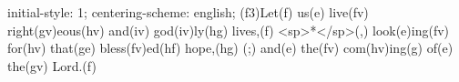 initial-style: 1;
centering-scheme: english;
(f3)Let(f) us(e) live(fv) right(gv)eous(hv) and(iv) god(iv)ly(hg) lives,(f) <sp>*</sp>(,) look(e)ing(fv) for(hv) that(ge) bless(fv)ed(hf) hope,(hg) (;) and(e) the(fv) com(hv)ing(g) of(e) the(gv) Lord.(f)
